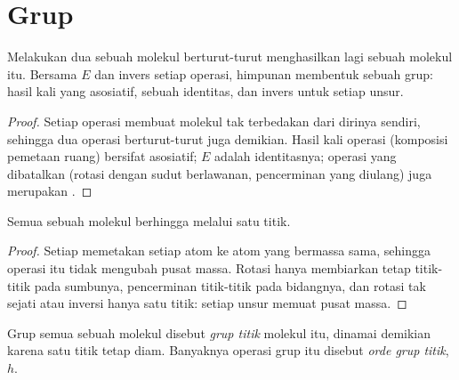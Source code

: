 \section{Grup}

\begin{proposition}\label{prop:b3:point-groups:closure}
Melakukan dua  sebuah molekul berturut-turut menghasilkan lagi
sebuah  molekul itu. Bersama $E$ dan invers setiap operasi,
himpunan  membentuk sebuah grup: hasil kali yang asosiatif,
sebuah identitas, dan invers untuk setiap unsur.
\end{proposition}

\begin{proof}
Setiap operasi membuat molekul tak terbedakan dari dirinya sendiri, sehingga
dua operasi berturut-turut juga demikian. Hasil kali operasi (komposisi
pemetaan ruang) bersifat asosiatif; $E$ adalah identitasnya; operasi yang
dibatalkan (rotasi dengan sudut berlawanan, pencerminan yang diulang) juga
merupakan .
\end{proof}

\begin{proposition}\label{prop:b3:point-groups:fixed-point}
Semua  sebuah molekul berhingga melalui satu titik.
\end{proposition}

\begin{proof}
Setiap  memetakan setiap atom ke atom yang bermassa sama,
sehingga operasi itu tidak mengubah pusat massa. Rotasi hanya membiarkan
tetap titik-titik pada sumbunya, pencerminan titik-titik pada bidangnya, dan
rotasi tak sejati atau inversi hanya satu titik: setiap unsur memuat pusat
massa.
\end{proof}

\begin{definition}\label{def:b3:point-groups:point-group}
Grup semua  sebuah molekul disebut \emph{grup
titik} molekul itu, dinamai demikian karena satu titik tetap
diam. Banyaknya operasi grup itu disebut \emph{orde grup
titik}, $h$.
\end{definition}

